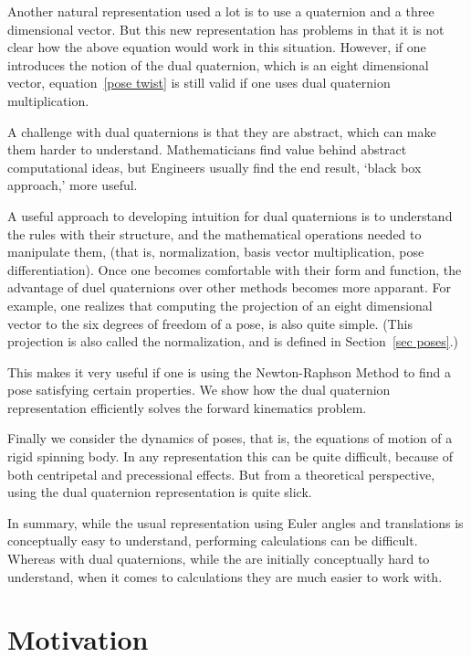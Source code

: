 \documentclass[reqno,12pt]{amsart}
\begin{document}
Another natural representation used a lot is to use a quaternion and a three dimensional vector.  But this new representation has problems in that it is not clear how the above equation would work in this situation.  However, if one introduces the notion of the dual quaternion, which is an eight dimensional vector, equation~\eqref{pose twist} is still valid if one uses dual quaternion multiplication.

A challenge with dual quaternions is that they are abstract, which can make them harder to understand.  Mathematicians find value behind abstract computational ideas, but Engineers usually find the end result, `black box approach,' more useful.

A useful approach to developing intuition for dual quaternions is to understand the rules with their structure, and the mathematical operations needed to manipulate them, (that is, normalization, basis vector multiplication, pose differentiation).  Once one becomes comfortable with their form and function, the advantage of duel quaternions over other methods becomes more apparant.  For example, one realizes that computing the projection of an eight dimensional vector to the six degrees of freedom of a pose, is also quite simple.  (This projection is also called the normalization, and is defined in Section~\ref{sec poses}.)

This makes it very useful if one is using the Newton-Raphson Method to find a pose satisfying certain properties.  We show how the dual quaternion representation efficiently solves the forward kinematics problem.

Finally we consider the dynamics of poses, that is, the equations of motion of a rigid spinning body.  In any representation this can be quite difficult, because of both centripetal and precessional effects.  But from a theoretical perspective, using the dual quaternion representation is quite slick.

In summary, while the usual representation using Euler angles and translations is conceptually easy to understand, performing calculations can be difficult.  Whereas with dual quaternions, while the are initially conceptually hard to understand, when it comes to calculations they are much easier to work with.

\section{Motivation}
\label{sec motivation}
\end{document}
